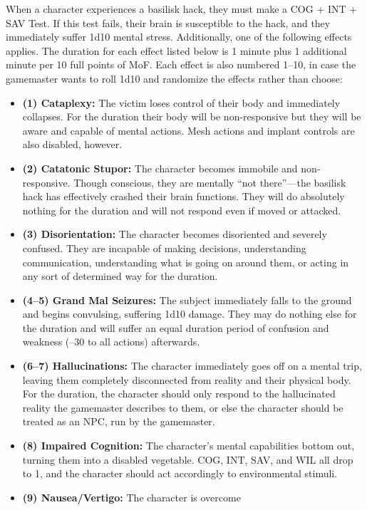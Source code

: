When a character experiences a basilisk hack, they 
must make a COG + INT + SAV Test. If this test 
fails, their brain is susceptible to the hack, and they 
immediately suffer 1d10 mental stress. Additionally, 
one of the following effects applies. The duration for 
each effect listed below is 1 minute plus 1 additional 
minute per 10 full points of MoF. Each effect is also 
numbered 1–10, in case the gamemaster wants to roll 
1d10 and randomize the effects rather than choose:

\begin{itemize}
\item  \textbf{(1) Cataplexy: }The victim loses control of their 
body and immediately collapses. For the duration 
their body will be non-responsive but they will 
be aware and capable of mental actions. Mesh 
actions and implant controls are also disabled, 
however.
\item  \textbf{(2) Catatonic Stupor:} The character becomes 
immobile and non-responsive. Though conscious, 
they are mentally ``not there''—the basilisk hack 
has effectively crashed their brain functions. They 
will do absolutely nothing for the duration and 
will not respond even if moved or attacked.
\item  \textbf{(3) Disorientation:} The character becomes disoriented and severely confused. They are incapable 
of making decisions, understanding communication, understanding what is going on around 
them, or acting in any sort of determined way for 
the duration.
\item \textbf{(4–5) Grand Mal Seizures:} The subject immediately
falls to the ground and begins convulsing,
suffering 1d10 damage. They may do nothing 
else for the duration and will suffer an equal 
duration period of confusion and weakness (–30 
to all actions) afterwards.
\item  \textbf{(6–7) Hallucinations:} The character immediately 
goes off on a mental trip, leaving them completely 
disconnected from reality and their physical body. 
For the duration, the character should only respond
to the hallucinated reality the gamemaster
describes to them, or else the character should be 
treated as an NPC, run by the gamemaster.
\item  \textbf{(8) Impaired Cognition:} The character's mental 
capabilities bottom out, turning them into a 
disabled vegetable. COG, INT, SAV, and WIL all 
drop to 1, and the character should act accordingly
to environmental stimuli.
\item  \textbf{(9) Nausea/Vertigo:} The character is overcome 

\end{itemize}

